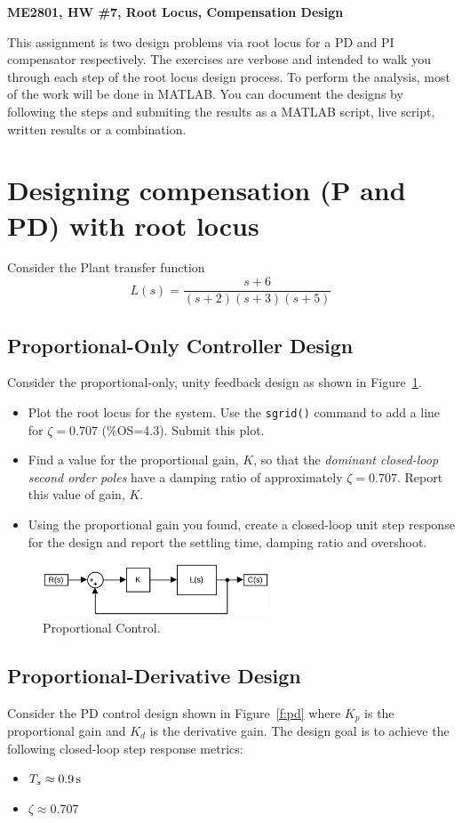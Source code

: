 \documentclass[11pt]{article}
\begin{document}
\begin{center}
  \huge{\bf ME2801, HW \#7, Root Locus, Compensation Design}
\end{center}

This assignment is two design problems via root locus for a PD and PI compensator respectively.  The exercises are verbose and intended to walk you through each step of the root locus design process.  To perform the analysis, most of the work will be done in MATLAB.  You can document the designs by following the steps and submiting the results as a MATLAB script, live script, written results or a combination.


\section{Designing compensation (P and PD) with root locus}

Consider the Plant transfer function
\[
L(s) = \frac{s+6}{(s+2)(s+3)(s+5)}
\]

\subsection{Proportional-Only Controller Design}
Consider the proportional-only, unity feedback design as shown in Figure~\ref{f:p}.
\begin{itemize}
\item Plot the root locus for the system.  Use the \texttt{sgrid()} command to add a line for $\zeta=0.707$ (\%OS=4.3).  Submit this plot.
\item Find a value for the proportional gain, $K$, so that the \emph{dominant closed-loop second order poles} have a damping ratio of approximately $\zeta = 0.707$.  Report this value of gain, $K$.
\item Using the proportional gain you found, create a closed-loop unit step response for the design and report the settling time, damping ratio and overshoot.
\end{itemize}
\begin{figure}[hbt!]
\centering  
\includegraphics [width=0.6\textwidth]{p_control.png}
\caption{Proportional Control.}
\label{f:p}
\end{figure}


\subsection{Proportional-Derivative Design}
Consider the PD control design shown in Figure~\ref{f:pd} where $K_p$ is the proportional gain and $K_d$ is the derivative gain.  The design goal is to achieve the following closed-loop step response metrics:
\begin{itemize}
\item $T_s \approx \unit[0.9]{s}$
\item $\zeta \approx 0.707$
\end{itemize}
\end{document}
